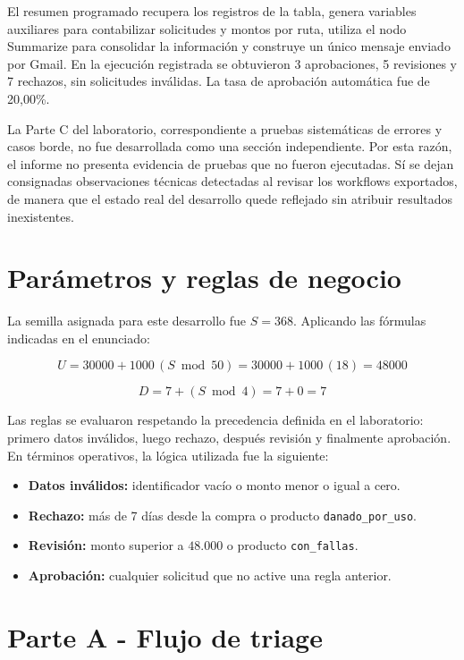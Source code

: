 \documentclass[11pt,a4paper]{article}
\begin{document}
El resumen programado recupera los registros de la tabla, genera variables auxiliares para contabilizar solicitudes y montos por ruta, utiliza el nodo Summarize para consolidar la información y construye un único mensaje enviado por Gmail. En la ejecución registrada se obtuvieron 3 aprobaciones, 5 revisiones y 7 rechazos, sin solicitudes inválidas. La tasa de aprobación automática fue de 20,00\%.

La Parte C del laboratorio, correspondiente a pruebas sistemáticas de errores y casos borde, no fue desarrollada como una sección independiente. Por esta razón, el informe no presenta evidencia de pruebas que no fueron ejecutadas. Sí se dejan consignadas observaciones técnicas detectadas al revisar los workflows exportados, de manera que el estado real del desarrollo quede reflejado sin atribuir resultados inexistentes.

\newpage
\section{Parámetros y reglas de negocio}

La semilla asignada para este desarrollo fue $S=368$. Aplicando las fórmulas indicadas en el enunciado:

\[
U = 30000 + 1000\,(S \bmod 50) = 30000 + 1000\,(18) = 48000
\]

\[
D = 7 + (S \bmod 4) = 7 + 0 = 7
\]

Las reglas se evaluaron respetando la precedencia definida en el laboratorio: primero datos inválidos, luego rechazo, después revisión y finalmente aprobación. En términos operativos, la lógica utilizada fue la siguiente:

\begin{itemize}
    \item \textbf{Datos inválidos:} identificador vacío o monto menor o igual a cero.
    \item \textbf{Rechazo:} más de 7 días desde la compra o producto \texttt{danado\_por\_uso}.
    \item \textbf{Revisión:} monto superior a $48.000$ o producto \texttt{con\_fallas}.
    \item \textbf{Aprobación:} cualquier solicitud que no active una regla anterior.
\end{itemize}

\section{Parte A - Flujo de triage}
\end{document}
